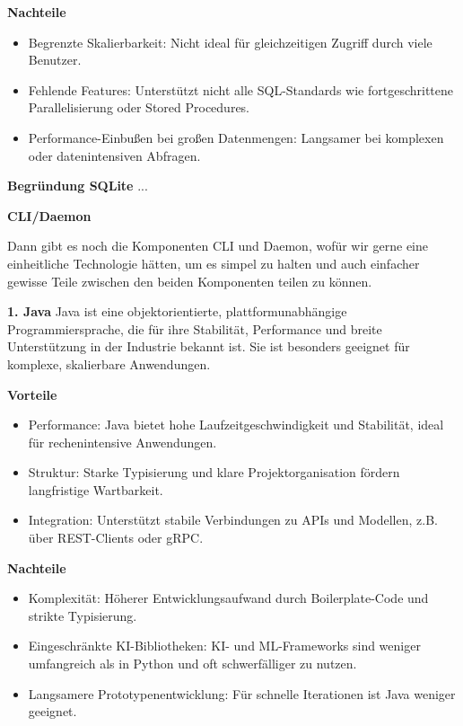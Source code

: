 \documentclass[a4paper,12pt]{report}
\begin{document}
    \textbf{Nachteile}
    \begin{itemize}
        \item Begrenzte Skalierbarkeit: Nicht ideal für gleichzeitigen Zugriff durch viele Benutzer.
        \item Fehlende Features: Unterstützt nicht alle SQL-Standards wie fortgeschrittene Parallelisierung oder Stored Procedures.
        \item Performance-Einbußen bei großen Datenmengen: Langsamer bei komplexen oder datenintensiven Abfragen.
    \end{itemize}

    \textbf{Begründung SQLite} ... %

        {\large\bfseries CLI/Daemon}

    Dann gibt es noch die Komponenten CLI und Daemon, wofür wir gerne eine einheitliche Technologie hätten,
    um es simpel zu halten und auch einfacher gewisse Teile zwischen den beiden Komponenten teilen zu können.

    \textbf{1. Java}
    Java ist eine objektorientierte, plattformunabhängige Programmiersprache,
    die für ihre Stabilität, Performance und breite Unterstützung in der Industrie bekannt ist.
    Sie ist besonders geeignet für komplexe, skalierbare Anwendungen.

    \textbf{Vorteile}
    \begin{itemize}
        \item Performance: Java bietet hohe Laufzeitgeschwindigkeit und Stabilität, ideal für rechenintensive Anwendungen.
        \item Struktur: Starke Typisierung und klare Projektorganisation fördern langfristige Wartbarkeit.
        \item Integration: Unterstützt stabile Verbindungen zu APIs und Modellen, z.B. über REST-Clients oder gRPC.
    \end{itemize}

    \textbf{Nachteile}
    \begin{itemize}
        \item Komplexität: Höherer Entwicklungsaufwand durch Boilerplate-Code und strikte Typisierung.
        \item Eingeschränkte KI-Bibliotheken: KI- und ML-Frameworks sind weniger umfangreich als in Python und oft schwerfälliger zu nutzen.
        \item Langsamere Prototypenentwicklung: Für schnelle Iterationen ist Java weniger geeignet.
    \end{itemize}
\end{document}
